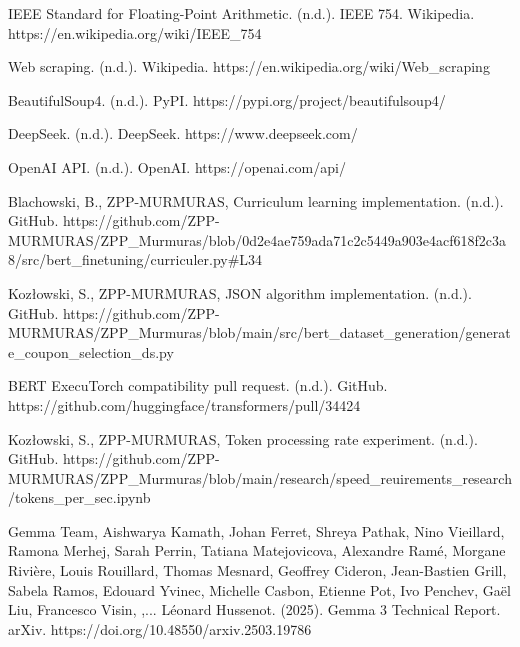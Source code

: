 \documentclass[licencjacka,en]{pracamgr}
\begin{document}
\begin{thebibliography}{99}
IEEE Standard for Floating-Point Arithmetic. (n.d.). IEEE 754. Wikipedia. https://en.wikipedia.org/wiki/IEEE\_754

Web scraping. (n.d.). Wikipedia. https://en.wikipedia.org/wiki/Web\_scraping

BeautifulSoup4. (n.d.). PyPI. https://pypi.org/project/beautifulsoup4/

DeepSeek. (n.d.). DeepSeek. https://www.deepseek.com/

OpenAI API. (n.d.). OpenAI. https://openai.com/api/

Blachowski, B., ZPP-MURMURAS, Curriculum learning implementation. (n.d.). GitHub. https://github.com/ZPP-MURMURAS/ZPP\_Murmuras/blob/0d2e4ae759ada71c2c5449a903e4acf618f2c3a8/src/bert\_finetuning/curriculer.py\#L34

Kozłowski, S., ZPP-MURMURAS, JSON algorithm implementation. (n.d.). GitHub. https://github.com/ZPP-MURMURAS/ZPP\_Murmuras/blob/main/src/bert\_dataset\_generation/generate\_coupon\_selection\_ds.py

BERT ExecuTorch compatibility pull request. (n.d.). GitHub. https://github.com/huggingface/transformers/pull/34424

Kozłowski, S., ZPP-MURMURAS, Token processing rate experiment. (n.d.). GitHub. https://github.com/ZPP-MURMURAS/ZPP\_Murmuras/blob/main/research/speed\_reuirements\_research/tokens\_per\_sec.ipynb

Gemma Team, Aishwarya Kamath, Johan Ferret, Shreya Pathak, Nino Vieillard, Ramona Merhej, Sarah Perrin, Tatiana Matejovicova, Alexandre Ramé, Morgane Rivière, Louis Rouillard, Thomas Mesnard, Geoffrey Cideron, Jean-Bastien Grill, Sabela Ramos, Edouard Yvinec, Michelle Casbon, Etienne Pot, Ivo Penchev, Gaël Liu, Francesco Visin, ,... Léonard Hussenot. (2025). Gemma 3 Technical Report. arXiv. https://doi.org/10.48550/arxiv.2503.19786

\end{thebibliography}
\end{document}
